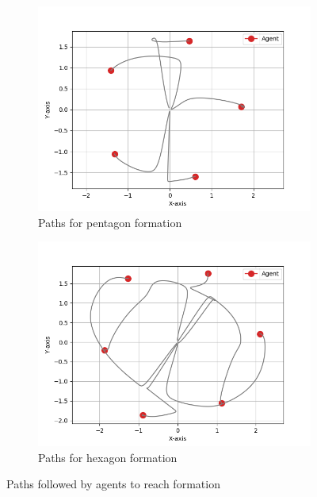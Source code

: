 \documentclass[a4paper,11pt,oneside]{book}
\begin{document}
\begin{figure}
\centering
	\begin{subfigure}{0.49\textwidth}	
	\includegraphics[width=\textwidth]{Pentagon_path.jpg}
	\caption{Paths for pentagon formation}
	\end{subfigure}
\hfill
	\begin{subfigure}{0.49\textwidth}	
	\includegraphics[width=\textwidth]{Hexagon_path.jpg}
	\caption{Paths for hexagon formation}
	\end{subfigure}
\caption{Paths followed by agents to reach formation}
\label{Paths}
\end{figure}
\end{document}
